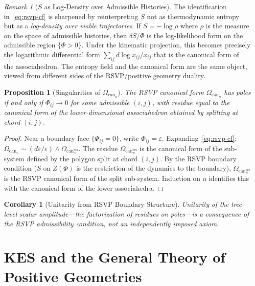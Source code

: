 \documentclass[12pt, oneside]{amsart}
\theoremstyle{plain}
\newtheorem{proposition}[theorem]{Proposition}
\newtheorem{corollary}[theorem]{Corollary}
\theoremstyle{definition}
\theoremstyle{remark}
\newtheorem{remark}[theorem]{Remark}
\newcommand{\eps}{\varepsilon}
\newcommand{\Phif}{\Phi}   %
\newcommand{\Sf}{S}         %
\newcommand{\CF}{\Omega_{\mathrm{can}}}
\begin{document}
\begin{remark}[$\Sf$ as Log-Density over Admissible Histories]
The identification in~\eqref{eq:rsvp-cf} is sharpened by reinterpreting $\Sf$ not as thermodynamic entropy but as a \emph{log-density over viable trajectories}. If $\Sf = -\log \rho$ where $\rho$ is the measure on the space of admissible histories, then $\delta\Sf/\Phif$ is the log-likelihood form on the admissible region $\{\Phif > 0\}$. Under the kinematic projection, this becomes precisely the logarithmic differential form $\sum_{ij} d\log x_{ij} / x_{ij}$ that is the canonical form of the associahedron. The entropy field and the canonical form are the same object, viewed from different sides of the RSVP/positive geometry duality.
\end{remark}

\begin{proposition}[Singularities of $\CF_n$]
\label{prop:cf-singularities}
The RSVP canonical form $\CF_n$ has poles if and only if $\Phif_{ij} \to 0$ for some admissible $(i,j)$, with residue equal to the canonical form of the lower-dimensional associahedron obtained by splitting at chord $(i,j)$.
\end{proposition}

\begin{proof}
Near a boundary face $\{\Phif_{ij} = 0\}$, write $\Phif_{ij} = \eps$. Expanding~\eqref{eq:rsvp-cf}: $\CF_n \sim (d\eps/\eps) \wedge \CF_n^{\mathrm{res}}$. The residue $\CF_n^{\mathrm{res}}$ is the canonical form of the sub-system defined by the polygon split at chord $(i,j)$. By the RSVP boundary condition ($\Sf$ on $Z(\Phif)$ is the restriction of the dynamics to the boundary), $\CF_n^{\mathrm{res}}$ is the RSVP canonical form of the split sub-system. Induction on $n$ identifies this with the canonical form of the lower associahedra.
\end{proof}

\begin{corollary}[Unitarity from RSVP Boundary Structure]
Unitarity of the tree-level scalar amplitude---the factorization of residues on poles---is a consequence of the RSVP admissibility condition, not an independently imposed axiom.
\end{corollary}

\section{KES and the General Theory of Positive Geometries}
\label{sec:kes}
\end{document}
